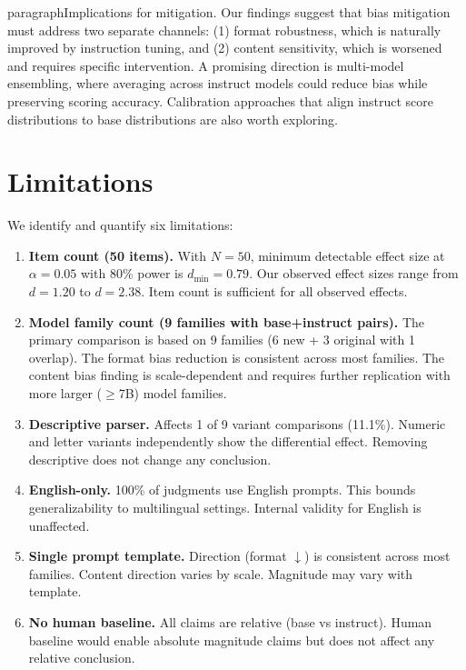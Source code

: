 \documentclass[11pt,twocolumn]{article}
\begin{document}
paragraph{Implications for mitigation.}
Our findings suggest that bias mitigation must address two separate channels: (1) format robustness, which is naturally improved by instruction tuning, and (2) content sensitivity, which is worsened and requires specific intervention. A promising direction is multi-model ensembling, where averaging across instruct models could reduce bias while preserving scoring accuracy. Calibration approaches that align instruct score distributions to base distributions are also worth exploring.

\section{Limitations}

We identify and quantify six limitations:

\begin{enumerate}
    \item \textbf{Item count (50 items).} With $N=50$, minimum detectable effect size at $\alpha=0.05$ with 80\% power is $d_{\min}=0.79$. Our observed effect sizes range from $d=1.20$ to $d=2.38$. Item count is sufficient for all observed effects.

    \item \textbf{Model family count (9 families with base+instruct pairs).} The primary comparison is based on 9 families (6 new + 3 original with 1 overlap). The format bias reduction is consistent across most families. The content bias finding is scale-dependent and requires further replication with more larger ($\geq$7B) model families.

    \item \textbf{Descriptive parser.} Affects 1 of 9 variant comparisons (11.1\%). Numeric and letter variants independently show the differential effect. Removing descriptive does not change any conclusion.

    \item \textbf{English-only.} 100\% of judgments use English prompts. This bounds generalizability to multilingual settings. Internal validity for English is unaffected.

    \item \textbf{Single prompt template.} Direction (format $\downarrow$) is consistent across most families. Content direction varies by scale. Magnitude may vary with template.

    \item \textbf{No human baseline.} All claims are relative (base vs instruct). Human baseline would enable absolute magnitude claims but does not affect any relative conclusion.
\end{enumerate}
\end{document}

